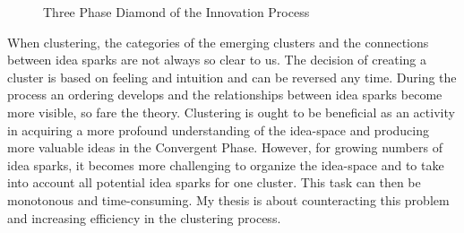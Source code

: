\documentclass[pdftex,a4paper,12pt]{scrartcl}
\theoremstyle{definition}
\begin{document}
\begin{figure}[h]
    \centering
    \caption{Three Phase Diamond of the Innovation Process \citep{tassoul_clustering:_2007}}
    \label{fig:diamond}
\end{figure}

When clustering, the categories of the emerging clusters and the connections between idea sparks are not always so clear to us. The decision of creating a cluster is based on feeling and intuition and can be reversed any time. During the process an ordering develops and the relationships between idea sparks become more visible, so fare the theory.
Clustering is ought to be beneficial as an activity in acquiring a more profound understanding of the idea-space \citep{siangliulue_ideahound:_2016} and producing more valuable ideas in the Convergent Phase. However, for growing numbers of idea sparks, it becomes more challenging to organize the idea-space and to take into account all potential idea sparks for one cluster. This task can then be monotonous and time-consuming. My thesis is about counteracting this problem and increasing efficiency in the clustering process.%
   
    
\end{document}
